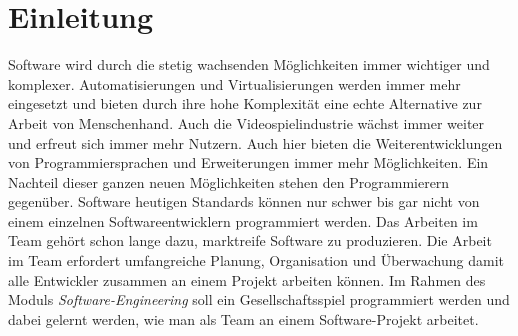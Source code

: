 \chapter{Einleitung}
Software wird durch die stetig wachsenden Möglichkeiten immer wichtiger und komplexer. Automatisierungen und Virtualisierungen werden immer mehr eingesetzt und bieten durch ihre hohe Komplexität eine echte Alternative zur Arbeit von Menschenhand. Auch die Videospielindustrie wächst immer weiter und erfreut sich immer mehr Nutzern. Auch hier bieten die Weiterentwicklungen von Programmiersprachen und Erweiterungen immer mehr Möglichkeiten. Ein Nachteil dieser ganzen neuen Möglichkeiten stehen den Programmierern gegenüber. Software heutigen Standards können nur schwer bis gar nicht von einem einzelnen Softwareentwicklern programmiert werden. Das Arbeiten im Team gehört schon lange dazu, marktreife Software zu produzieren. Die Arbeit im Team erfordert umfangreiche Planung, Organisation und Überwachung damit alle Entwickler zusammen an einem Projekt arbeiten können. Im Rahmen des Moduls \textit{Software-Engineering} soll ein Gesellschaftsspiel programmiert werden und dabei gelernt werden, wie man als Team an einem Software-Projekt arbeitet. 
